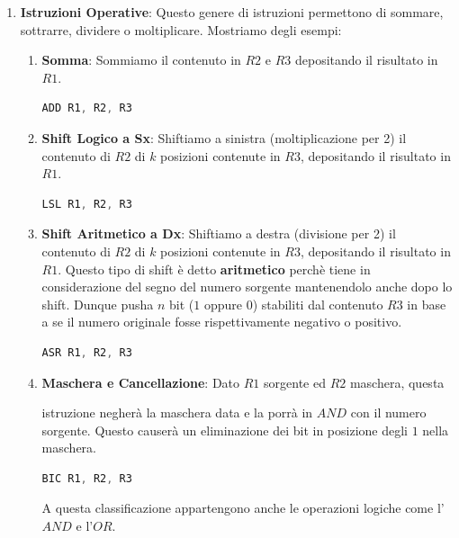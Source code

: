 \documentclass{article}
\begin{document}
\begin{enumerate}
    \item \textbf{Istruzioni Operative}: Questo genere di istruzioni permettono di sommare, sottrarre, dividere o moltiplicare. Mostriamo degli esempi:
\begin{enumerate}
\item \textbf{Somma}: Sommiamo il contenuto in $R2$ e $R3$ depositando il risultato in $R1$.
\begin{lstlisting}[language = JavaScript]
    ADD R1, R2, R3
\end{lstlisting}
\vspace*{-20px}

\item \textbf{Shift Logico a Sx}: Shiftiamo a sinistra (moltiplicazione per 2) il contenuto di $R2$ di $k$ posizioni contenute in $R3$, depositando il risultato in $R1$.
\begin{lstlisting}[language = JavaScript]
    LSL R1, R2, R3
\end{lstlisting}
\vspace*{-20px}

\item \textbf{Shift Aritmetico a Dx}: Shiftiamo a destra (divisione per 2) il contenuto di $R2$ di $k$ posizioni contenute in $R3$, depositando il risultato in $R1$. Questo tipo di shift è detto \textbf{aritmetico} perchè tiene in considerazione del segno del numero sorgente mantenendolo anche dopo lo shift. Dunque pusha $n$ bit ($1$ oppure $0$) stabiliti dal contenuto $R3$ in base a se il numero originale fosse rispettivamente negativo o positivo. 
\begin{lstlisting}[language = JavaScript]
    ASR R1, R2, R3
\end{lstlisting}
\vspace*{-20px}

\item \textbf{Maschera e Cancellazione}: Dato $R1$ sorgente ed $R2$ maschera, questa 

istruzione negherà la maschera data e la porrà in $AND$ con il numero sorgente. Questo causerà un eliminazione dei bit in posizione degli $1$ nella maschera.
\begin{lstlisting}[language = JavaScript]
    BIC R1, R2, R3
\end{lstlisting}
\vspace*{-20px}

A questa classificazione appartengono anche le operazioni logiche come l'$AND$ e l'$OR$.


\end{enumerate}
\end{enumerate}
\end{document}
